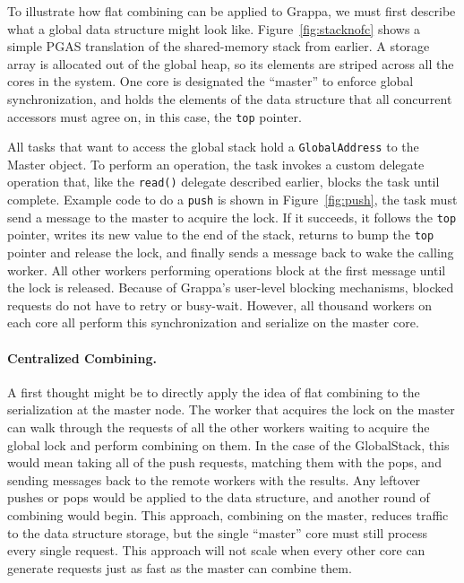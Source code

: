 To illustrate how flat combining can be applied to Grappa, we must first describe what a global data structure might look like. Figure~\ref{fig:stacknofc} shows a simple PGAS translation of the shared-memory stack from earlier. A storage array is allocated out of the global heap, so its elements are striped across all the cores in the system. One core is designated the ``master'' to enforce global synchronization, and holds the elements of the data structure that all concurrent accessors must agree on, in this case, the \texttt{top} pointer.

All tasks that want to access the global stack hold a \texttt{GlobalAddress} to the Master object. To perform an operation, the task invokes a custom delegate operation that, like the \texttt{read()} delegate described earlier, blocks the task until complete. Example code to do a \texttt{push} is shown in Figure~\ref{fig:push}, the task must send a message to the master to acquire the lock. If it succeeds, it follows the \texttt{top} pointer, writes its new value to the end of the stack, returns to bump the \texttt{top} pointer and release the lock, and finally sends a message back to wake the calling worker. All other workers performing operations block at the first message until the lock is released. Because of Grappa's user-level blocking mechanisms, blocked requests do not have to retry or busy-wait. However, all thousand workers on each core all perform this synchronization and serialize on the master core.

\paragraph{Centralized Combining.}
A first thought might be to directly apply the idea of flat combining to the serialization at the master node. The worker that acquires the lock on the master can walk through the requests of all the other workers waiting to acquire the global lock and perform combining on them. In the case of the GlobalStack, this would mean taking all of the push requests, matching them with the pops, and sending messages back to the remote workers with the results. Any leftover pushes or pops would be applied to the data structure, and another round of combining would begin. This approach, combining on the master, reduces traffic to the data structure storage, but the single ``master'' core must still process every single request. This approach will not scale when every other core can generate requests just as fast as the master can combine them.

